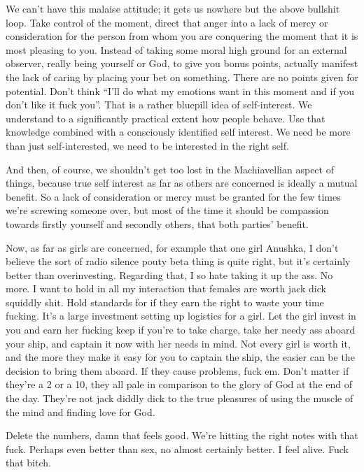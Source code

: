 We can't have this malaise attitude; it gets us nowhere but the above
bullshit loop. Take control of the moment, direct that anger into a lack
of mercy or consideration for the person from whom you are conquering
the moment that it is most pleasing to you. Instead of taking some moral
high ground for an external observer, really being yourself or God, to
give you bonus points, actually manifest the lack of caring by placing
your bet on something. There are no points given for potential. Don't
think ``I'll do what my emotions want in this moment and if you don't
like it fuck you''. That is a rather bluepill idea of self-interest. We
understand to a significantly practical extent how people behave. Use
that knowledge combined with a consciously identified self interest. We
need be more than just self-interested, we need to be interested in the
right self.

And then, of course, we shouldn't get too lost in the Machiavellian
aspect of things, because true self interest as far as others are
concerned is ideally a mutual benefit. So a lack of consideration or
mercy must be granted for the few times we're screwing someone over, but
most of the time it should be compassion towards firstly yourself and
secondly others, that both parties' benefit.

Now, as far as girls are concerned, for example that one girl Anushka, I
don't believe the sort of radio silence pouty beta thing is quite right,
but it's certainly better than overinvesting. Regarding that, I so hate
taking it up the ass. No more. I want to hold in all my interaction that
females are worth jack dick squiddly shit. Hold standards for if they
earn the right to waste your time fucking. It's a large investment
setting up logistics for a girl. Let the girl invest in you and earn her
fucking keep if you're to take charge, take her needy ass aboard your
ship, and captain it now with her needs in mind. Not every girl is worth
it, and the more they make it easy for you to captain the ship, the
easier can be the decision to bring them aboard. If they cause problems,
fuck em. Don't matter if they're a 2 or a 10, they all pale in
comparison to the glory of God at the end of the day. They're not jack
diddly dick to the true pleasures of using the muscle of the mind and
finding love for God.

Delete the numbers, damn that feels good. We're hitting the right notes
with that fuck. Perhaps even better than sex, no almost certainly
better. I feel alive. Fuck that bitch.

